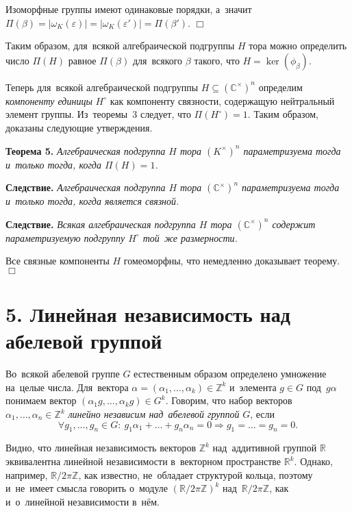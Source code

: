 \documentclass[twoside]{article}
\begin{document}
    Изоморфные группы имеют одинаковые порядки, а~значит $\Pi(\beta) = |\omega_K(\varepsilon)| = |\omega_K(\varepsilon')| = \Pi(\beta')$.
\hfill$\Box$\medskip

Таким образом, для~всякой алгебраической подгруппы $H$ тора можно определить число $\Pi(H)$
равное $\Pi(\beta)$ для~всякого $\beta$ такого, что $H = \ker(\phi_\beta)$.

Теперь для~всякой алгебраической подгруппы $H \subseteq (\mathbb{C}^\times)^n$ определим \textit{компоненту единицы} $H^\circ$
как компоненту связности, содержащую нейтральный элемент группы. Из~теоремы~3 следует, что $\Pi(H^\circ) = 1$.
Таким образом, доказаны следующие утверждения.

\medskip\noindent\textbf{Теорема 5.}\emph{
    Алгебраическая подгруппа $H$ тора $(K^\times)^n$ параметризуема тогда и~только тогда, когда $\Pi(H) = 1$.
}

\medskip\noindent\textbf{Следствие.}\emph{
    Алгебраическая подгруппа $H$ тора $(\mathbb{C}^\times)^n$ параметризуема тогда и~только тогда, когда является связной.
}

\medskip\noindent\textbf{Следствие.}\emph{
    Всякая алгебраическая подгруппа $H$ тора $(\mathbb{C}^\times)^n$ содержит параметризуемую подгруппу $H^\circ$ той~же размерности.
}\medskip

    Все связные компоненты $H$ гомеоморфны, что немедленно доказывает теорему.
\hfill$\Box$\medskip

\section*{5. Линейная независимость над абелевой группой}

Во~всякой абелевой группе $G$ естественным образом определено умножение на~целые числа.
Для~вектора $\alpha = (\alpha_1, \ldots, \alpha_k) \in \mathbb{Z}^k$ и~элемента $g \in G$
под~$g \alpha$ понимаем вектор $(\alpha_1 g, \ldots, \alpha_k g) \in G^k$.
Говорим, что набор векторов $\alpha_1, \ldots, \alpha_n \in \mathbb{Z}^k$ \textit{линейно независим над~абелевой группой} $G$, если
$$
    \forall g_1, \ldots, g_n \in G{:}\ g_1 \alpha_1 + \ldots + g_n \alpha_n = 0 \Rightarrow g_1 = \ldots = g_n = 0.
$$

Видно, что линейная независимость векторов $\mathbb{Z}^k$ над~аддитивной группой $\mathbb{R}$ эквивалентна линейной независимости
в~векторном пространстве $\mathbb{R}^k$. Однако, например, $\mathbb{R} / 2 \pi \mathbb{Z}$, как известно, не~обладает структурой кольца,
поэтому и~не~имеет смысла говорить о~модуле $(\mathbb{R} / 2 \pi \mathbb{Z})^k$ над~$\mathbb{R} / 2 \pi \mathbb{Z}$, как и~о~линейной независимости
в~нём.
\end{document}
